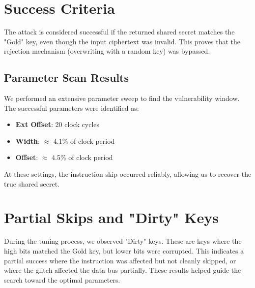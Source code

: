 \section{Success Criteria}
The attack is considered successful if the returned shared secret matches the "Gold" key, even though the input ciphertext was invalid. This proves that the rejection mechanism (overwriting with a random key) was bypassed.

\subsection{Parameter Scan Results}
We performed an extensive parameter sweep to find the vulnerability window. The successful parameters were identified as:

\begin{itemize}
    \item \textbf{Ext Offset}: 20 clock cycles
    \item \textbf{Width}: $\approx$ 4.1\% of clock period
    \item \textbf{Offset}: $\approx$ 4.5\% of clock period
\end{itemize}

At these settings, the instruction skip occurred reliably, allowing us to recover the true shared secret.

\section{Partial Skips and "Dirty" Keys}
During the tuning process, we observed "Dirty" keys. These are keys where the high bits matched the Gold key, but lower bits were corrupted. This indicates a partial success where the instruction was affected but not cleanly skipped, or where the glitch affected the data bus partially. These results helped guide the search toward the optimal parameters.
